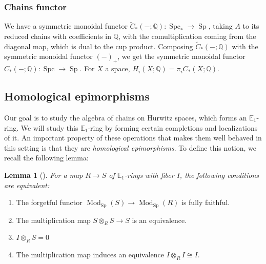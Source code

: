 \documentclass[12 pt]{amsart}
\theoremstyle{plain}
\newtheorem{lemma}[theorem]{Lemma}
\theoremstyle{definition}
\theoremstyle{remark}
\numberwithin{equation}{section}
\newcommand \cC{{\mathcal C}}
\DeclareMathOperator\Alg{Alg}
\DeclareMathOperator\Sp{Sp}
\DeclareMathOperator\Spc{Spc}
\DeclareMathOperator\coCAlg{coCAlg}
\DeclareMathOperator\Mod{Mod}
\newcommand\QQ{\mathbb{Q}}
\newcommand\EE{\mathbb{E}}
\begin{document}
\subsubsection{Chains functor}
We have a symmetric monoidal functor $\tilde{C}_*(-;\QQ): \Spc_*\to \Sp$, 
taking $A$ to its reduced chains with coefficients in $\QQ$, with the comultiplication
coming from the diagonal map, which is dual to the cup product. Composing
$\tilde{C}_*(-;\QQ)$ with the symmetric monoidal functor $(-)_+$, we get the symmetric monoidal functor $C_*(-;\QQ): \Spc \to \Sp$. 
For $X$ a space, $H_i(X;\QQ) = \pi_iC_*(X;\QQ)$. 

\subsection{Homological epimorphisms}
\label{subsection:hom-epi}

Our goal is to study the algebra of chains on Hurwitz spaces, which forms an $\EE_1$-ring. We will study this $\EE_1$-ring by forming certain completions and localizations of it. An important property of these operations that makes them well behaved in this setting is that they are \textit{homological epimorphisms}. To define this notion, we recall the following lemma:
\begin{lemma}[{\cite[Lemma 2.9.8]{sheavesonmanifolds}}]\label{lemma:homepi}
	For a map $R \to S$ of $\EE_1$-rings with fiber $I$, the following conditions are equivalent:
\end{lemma}
\begin{enumerate}
	\item The forgetful functor $\Mod_{\Sp}(S) \to \Mod_{\Sp}(R)$ is fully faithful.
	\item The multiplication map $S \otimes_RS \to S$ is an equivalence.
	\item $I\otimes_RS =0$ 
	\item The multiplication map induces an equivalence $I\otimes_RI\cong I$.
\end{enumerate}
\end{document}
